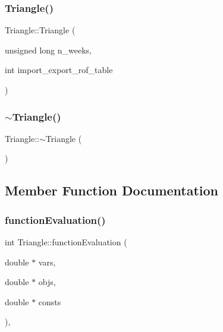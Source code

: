 \subsubsection{\texorpdfstring{Triangle()}{Triangle()}}
{\footnotesize\ttfamily Triangle\+::\+Triangle (\begin{DoxyParamCaption}\item[{unsigned long}]{n\+\_\+weeks,  }\item[{int}]{import\+\_\+export\+\_\+rof\+\_\+table }\end{DoxyParamCaption})}

\mbox{\label{classTriangle_a5199760a17454f4dc94c855a57e3a152}} 
\subsubsection{\texorpdfstring{$\sim$\+Triangle()}{~Triangle()}}
{\footnotesize\ttfamily Triangle\+::$\sim$\+Triangle (\begin{DoxyParamCaption}{ }\end{DoxyParamCaption})\hspace{0.3cm}{\ttfamily [default]}}



\subsection{Member Function Documentation}
\mbox{\label{classTriangle_a9e95039d098fd61cce1a830b85ed7004}} 
\subsubsection{\texorpdfstring{function\+Evaluation()}{functionEvaluation()}}
{\footnotesize\ttfamily int Triangle\+::function\+Evaluation (\begin{DoxyParamCaption}\item[{double $\ast$}]{vars,  }\item[{double $\ast$}]{objs,  }\item[{double $\ast$}]{consts }\end{DoxyParamCaption})\hspace{0.3cm}{\ttfamily [override]}, {\ttfamily [virtual]}}

